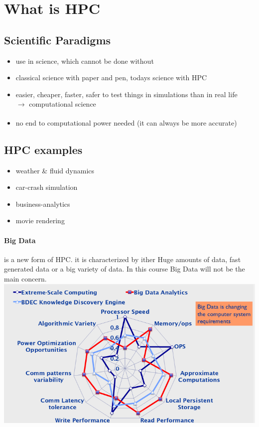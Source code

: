 \documentclass[a4paper]{article}
\begin{document}
\section{What is HPC}
\subsection{Scientific Paradigms}
	\begin{itemize}
	\setlength{\itemsep}{-3pt}
	\item use in science, which cannot be done without
	\item classical science with paper and pen, todays science with HPC
	\item easier, cheaper, faster, safer to test things in simulations than in real life \\
	$\xrightarrow[]{}$ computational science\\
	\item no end to computational power needed (it can always be more accurate)
	\end{itemize}
	
\subsection{HPC examples}
	\begin{itemize}
	\setlength{\itemsep}{-3pt}
	\item weather \& fluid dynamics
	\item car-crash simulation
	\item business-analytics
	\item movie rendering
	\end{itemize}
	
	\paragraph{Big Data}
	is a new form of HPC. it is characterized by ither Huge amounts of data, fast generated
	data or a big variety of data. In this course Big Data will not be the main concern.\\
	\includegraphics[width=400pt]{img/HPCRadar.png}\\\\
\end{document}
